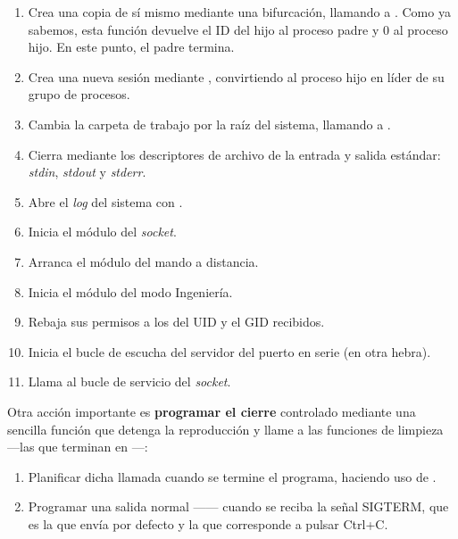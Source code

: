 \begin{enumerate}
	\item Crea una copia de sí mismo mediante una bifurcación, llamando a . Como ya sabemos, esta función devuelve el ID del hijo al proceso padre y 0 al proceso hijo. En este punto, el padre termina.
	
	\item Crea una nueva sesión mediante , convirtiendo al proceso hijo en líder de su grupo de procesos.
	
	\item Cambia la carpeta de trabajo por la raíz del sistema, llamando a .
	
	\item Cierra mediante  los descriptores de archivo de la entrada y salida estándar: \textit{stdin}, \textit{stdout} y \textit{stderr}.
	
	\item Abre el \textit{log} del sistema con .
	
	\item Inicia el módulo del \textit{socket}.
	
	\item Arranca el módulo del mando a distancia.
	
	\item Inicia el módulo del modo Ingeniería.
	
	\item Rebaja sus permisos a los del \acrshort{UID} y el \acrshort{GID} recibidos.
	
	\item Inicia el bucle de escucha del servidor del puerto en serie (en otra hebra).
	
	\item Llama al bucle de servicio del \textit{socket}.
	
\end{enumerate}

Otra acción importante es \textbf{programar el cierre} controlado mediante una sencilla función que detenga la reproducción y llame a las funciones de limpieza ---las que terminan en ---:

\begin{enumerate}
	\item Planificar dicha llamada cuando se termine el programa, haciendo uso de .
	\item Programar una salida normal ------ cuando se reciba la señal SIGTERM, que es la que envía por defecto  y la que corresponde a pulsar Ctrl+C.
\end{enumerate}

